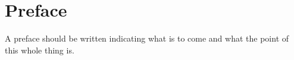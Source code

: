 
\chapter{Preface}

A preface should be written indicating what is to come and what the point of this whole thing is.